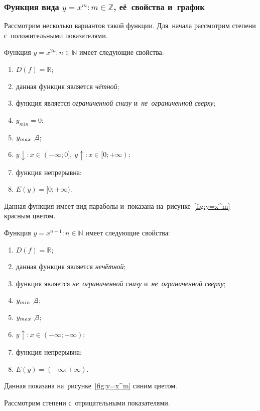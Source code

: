 \documentclass[]{scrartcl}
\begin{document}
\subsubsection{Функция вида ${\textstyle y=x^m:m \in \mathbb{Z}}$, её~свойства и~график}
Рассмотрим несколько вариантов такой функции. Для~начала рассмотрим степени с~положительными показателями.

Функция ${\textstyle y=x^{2n}: n \in \mathbb{N}}$ имеет следующие свойства:
\begin{enumerate}
	\item ${\textstyle D(f)=\mathbb{R}}$;
	\item данная функция является \emph{чётной};
	\item функция является \emph{ограниченной снизу} и~\emph{не~ограниченной сверху};
	\item ${\textstyle y_{min}=0}$;
	\item ${\textstyle y_{max}\not \exists}$;
	\item ${\textstyle y\downarrow:x\in (-\infty;0],\ y\uparrow:x\in [0;+\infty)}$;
	\item функция непрерывна:
	\item ${\textstyle E(y)=[0;+\infty)}$.
\end{enumerate}
Данная функция имеет вид параболы и~показана на~рисунке~\ref{fig:y=x^m} красным цветом.

Функция ${\textstyle y=x^{n+1}: n \in \mathbb{N}}$ имеет следующие свойства:
\begin{enumerate}
	\item ${\textstyle D(f)=\mathbb{R}}$;
	\item данная функция является \emph{нечётной};
	\item функция является \emph{не~ограниченной снизу} и~\emph{не~ограниченной сверху};
	\item ${\textstyle y_{min}\not \exists}$;
	\item ${\textstyle y_{max}\not \exists}$;
	\item ${\textstyle y\uparrow:x\in (-\infty;+\infty)}$;
	\item функция непрерывна:
	\item ${\textstyle E(y)=(-\infty;+\infty)}$.
\end{enumerate}
Данная показана на~рисунке~\ref{fig:y=x^m} синим цветом.

Рассмотрим степени с~отрицательными показателями.
\end{document}
